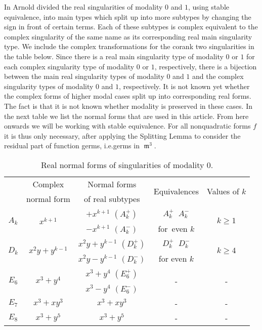 \documentclass[noend]{amsproc}
\DeclareMathOperator{\requiv}{\overset{r}{\sim}}
\DeclareMathOperator{\m}{\mathfrak{m}}
\begin{document}
In \cite{AVG1985} Arnold divided the real singularities of modality $0$ and
$1$, using stable equivalence, into main types which split up into more
subtypes by changing the sign in front of certain terms. Each of these subtypes
is complex equivalent to the complex singularity of the same name as its
corresponding real main singularity type. We include the complex
transformations for the corank two singularities in the table below. Since
there is a real main singularity type of modality $0$ or $1$ for each complex
singularity type of modality $0$ or $1$, respectively, there is a bijection
between the main real singularity types of modality $0$ and $1$ and the complex
singularity types of modality $0$ and $1$, respectively. It is not known yet
whether the complex forms of higher modal cases  split up into corresponding
real forms. The fact is that it is not known whether modality is preserved in
these cases. In the next table we list the normal forms that are used in this
article. From here onwards we will be working with stable equivalence. For all
nonquadratic forms $f$ it is thus only necessary, after applying the Splitting
Lemma to consider the residual part of function germs, i.e.\@ germs in $\m^3$.

\begin{table}[!hbp]
\centering
\caption{Real normal forms of singularities of modality $0$.}
\label{normal forms}
\begin{tabular}{|c|c|c|c|c|}
\hline
& Complex & Normal forms & \multirow{2}{*}{Equivalences} &
\multirow{2}{*}{Values of $k$} \\
& normal form & of real subtypes & & \\
\hline
\multirow{2}{*}{$A_k$} & \multirow{2}{*}{$x^{k+1}$} & $+x^{k+1}$ $(A_k^+)$ &
$A_k^+ \requiv A_k^-$ & \multirow{2}{*}{$k \geq 1$} \\
& & $-x^{k+1}$ $(A_k^-)$ & for~even $k$ & \\
\hline
\multirow{2}{*}{$D_k$} & \multirow{2}{*}{$x^2y+y^{k-1}$} &
$x^2y+y^{k-1}$ $(D_k^+)$ & $D_k^+ \requiv D_k^-$ &
\multirow{2}{*}{$k \geq 4$} \\
& & $x^2y-y^{k-1}$ $(D_k^-)$ & for even $k$ & \\
\hline
\multirow{2}{*}{$E_6$} & \multirow{2}{*}{$x^3+y^4$} & $x^3+y^4$ $(E_6^+)$ &
\multirow{2}{*}{-} & \multirow{2}{*}{-} \\
& & $x^3-y^4$ $(E_6^-)$ & & \\
\hline
$E_7$ & $x^3+xy^3$ & $x^3+xy^3$ & - & - \\
\hline
$E_8$ & $x^3+y^5$ & $x^3+y^5$ & - & - \\
\hline
\end{tabular}
\end{table}
\end{document}
